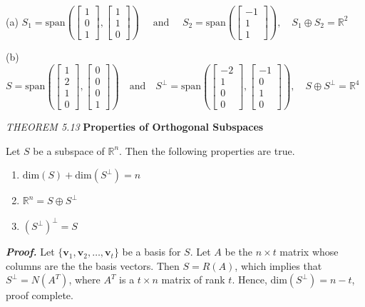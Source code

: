\documentclass{article}
\newcommand\B{\textbf}
\newcommand\tcl{\begin{tcolorbox}[colback = {blue9}]}
\newcommand\etcl{\end{tcolorbox}}
\newcommand\x{\times}
\newcommand\R{\mathbb{R}}
\newcommand\T{\textit}
\begin{document}
    (a) $S_1 = \text{span}\left( 
        \begin{bmatrix}
            1 \\ 0 \\ 1
        \end{bmatrix},
        \begin{bmatrix}
            1 \\ 1 \\ 0
        \end{bmatrix}
        \right) \quad \text{ and   } \quad 
        S_2 = \text{span}\left(
            \begin{bmatrix}
                -1 \\ 1 \\ 1
            \end{bmatrix}
            \right), \quad S_1 \oplus S_2 = \R^2$

    (b) $S = \text{span}\left(
            \begin{bmatrix}
                1 \\
                2 \\
                1 \\
                0
            \end{bmatrix},
            \begin{bmatrix}
                0 \\
                0 \\
                0 \\
                1
            \end{bmatrix}
        \right) \quad \text{and} \quad 
        S^\perp = \text{span}\left(
            \begin{bmatrix}
                -2 \\
                1 \\
                0 \\
                0
            \end{bmatrix},
            \begin{bmatrix}
                -1 \\
                0 \\
                1 \\
                0
            \end{bmatrix}
        \right), \quad S \oplus S^\perp = \R^4$

    \tcl
    \T{THEOREM 5.13} \B{Properties of Orthogonal Subspaces}

    Let $S$ be a subspace of $\R^n$. Then the following properties are true.
    \begin{enumerate}
        \item $\text{dim}(S) + \text{dim}(S^\perp) = n$
        \item $\R^n = S \oplus S^\perp$
        \item $(S^\perp)^\perp = S$
    \end{enumerate}
    \etcl 
    \B{\T{Proof.}} Let $\{ \B{v}_1, \B{v}_2, \dots, \B{v}_t \}$ be a basis for $S$. Let $A$ be the $n \x t$ matrix
    whose columns are the the basis vectors. Then $S = R(A)$, which implies that $S^\perp = N(A^T)$, where 
    $A^T$ is a $t \x n$ matrix of rank $t$. Hence, $\text{dim}(S^\perp) = n - t$, proof complete.
\end{document}
